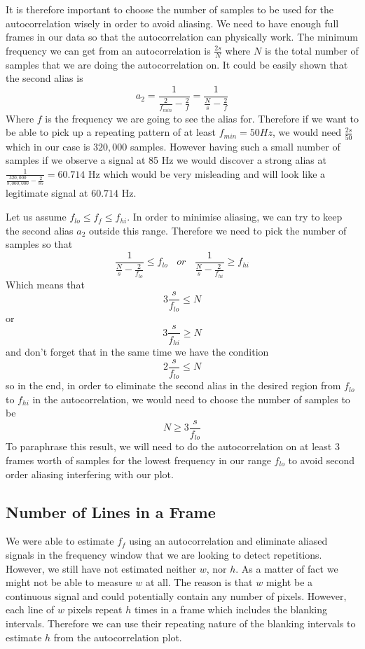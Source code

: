 \documentclass[a4paper,12pt,twoside,openright]{report}
\begin{document}
It is therefore important to choose the number of samples to be used for the autocorrelation wisely in order to avoid aliasing. We need to have enough full frames in our data so that the autocorrelation can physically work. The minimum frequency we can get from an autocorrelation is $\frac{2 s}{N}$ where $N$ is the total number of samples that we are doing the autocorrelation on. It could be easily shown that the second alias is
\begin{equation}
a_{2} = \frac{1}{\frac{2}{f_{min}}-\frac{2}{f}} = \frac{1}{\frac{N}{s}-\frac{2}{f}}
\end{equation}
Where $f$ is the frequency we are going to see the alias for. Therefore if we want to be able to pick up a repeating pattern of at least $f_{min} = 50 Hz$, we would need $\frac{2 s}{50}$ which in our case is $320,000$ samples. However having such a small number of samples if we observe a signal at 85 Hz we would discover a strong alias at $\frac{1}{\frac{320,000}{8,000,000}-\frac{2}{85} } = 60.714$ Hz which would be very misleading and will look like a legitimate signal at $60.714$ Hz. 

Let us assume $f_{lo} \leq f_{f} \leq f_{hi}$. In order to minimise aliasing, we can try to keep the second alias $a_{2}$ outside this range. Therefore we need to pick the number of samples so that
$$ \frac{1}{\frac{N}{s}-\frac{2}{f_{lo}}} \leq f_{lo} \,\,\,\,\ or \,\,\,\,\ \frac{1}{\frac{N}{s}-\frac{2}{f_{hi}}} \geq f_{hi} $$
Which means that
$$ 3 \frac{s}{f_{lo}} \leq N $$
or
$$3 \frac{s}{f_{hi}} \geq N $$
and don't forget that in the same time we have the condition
$$2 \frac{s}{f_{lo}} \leq N$$
so in the end, in order to eliminate the second alias in the desired region from $f_{lo}$ to $f_{hi}$ in the autocorrelation, we would need to choose the number of samples to be
\begin{equation}
\label{eq:autocorraliasingcondition}
N \geq 3 \frac{s}{f_{lo}}
\end{equation}
To paraphrase this result, we will need to do the autocorrelation on at least 3 frames worth of samples for the lowest frequency in our range $f_{lo}$ to avoid second order aliasing interfering with our plot.

\subsection{Number of Lines in a Frame}

We were able to estimate $f_{f}$ using an autocorrelation and eliminate aliased signals in the frequency window that we are looking to detect repetitions. However, we still have not estimated neither $w$, nor $h$. As a matter of fact we might not be able to measure $w$ at all. The reason is that $w$ might be a continuous signal and could potentially contain any number of pixels. However, each line of $w$ pixels repeat $h$ times in a frame which includes the blanking intervals. Therefore we can use their repeating nature of the blanking intervals to estimate $h$ from the autocorrelation plot.
\end{document}
